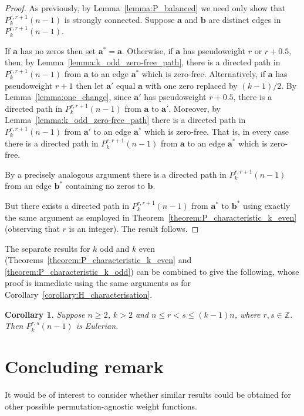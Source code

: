\documentclass[a4paper,11pt]{article}
\theoremstyle{plain}
\newtheorem{corollary}[lemma]{Corollary}
\theoremstyle{definition}
\theoremstyle{remark}
\begin{document}
\begin{proof}
As previously, by Lemma~\ref{lemma:P_balanced} we need only show that $P_k^{r,r+1}(n-1)$ is
strongly connected.  Suppose $\mathbf{a}$ and $\mathbf{b}$ are distinct edges in
$P_k^{r,r+1}(n-1)$.

If $\mathbf{a}$ has no zeros then set $\mathbf{a}^*=\mathbf{a}$. Otherwise, if $\mathbf{a}$ has
pseudoweight $r$ or $r+0.5$, then, by Lemma~\ref{lemma:k_odd_zero-free_path}, there is a directed
path in $P_k^{r,r+1}(n-1)$ from $\mathbf{a}$ to an edge $\mathbf{a}^*$ which is zero-free.
Alternatively, if $\mathbf{a}$ has pseudoweight $r+1$ then let $\mathbf{a}'$ equal $\mathbf{a}$
with one zero replaced by $(k-1)/2$.  By Lemma~\ref{lemma:one_change}, since $\mathbf{a}'$ has
pseudoweight $r+0.5$, there is a directed path in $P_k^{r,r+1}(n-1)$ from $\mathbf{a}$ to
$\mathbf{a}'$. Moreover,  by Lemma~\ref{lemma:k_odd_zero-free_path} there is a directed path in
$P_k^{r,r+1}(n-1)$ from $\mathbf{a}'$ to an edge $\mathbf{a}^*$ which is zero-free.  That is, in
every case there is a directed path in $P_k^{r,r+1}(n-1)$ from $\mathbf{a}$ to an edge
$\mathbf{a}^*$ which is zero-free.

By a precisely analogous argument there is a directed path in $P_k^{r,r+1}(n-1)$ from an edge
$\mathbf{b}^*$ containing no zeros to $\mathbf{b}$.

But there exists a directed path in $P_k^{r,r+1}(n-1)$ from $\mathbf{a}^*$ to $\mathbf{b}^*$ using
exactly the same argument as employed in Theorem~\ref{theorem:P_characteristic_k_even} (observing
that $r$ is an integer).  The result follows.
\end{proof}

The separate results for $k$ odd and $k$ even (Theorems~\ref{theorem:P_characteristic_k_even} and
\ref{theorem:P_characteristic_k_odd}) can be combined to give the following, whose proof is
immediate using the same arguments as for Corollary~\ref{corollary:H_characterisation}.

\begin{corollary} \label{corollary:P_characteristic}
Suppose $n\geq2$, $k>2$ and $n\leq r< s\leq (k-1)n$, where $r,s\in\mathbb{Z}$. Then
$P_k^{r,s}(n-1)$ is Eulerian.
\end{corollary}

\section{Concluding remark}

It would be of interest to consider whether similar results could be obtained for other possible
permutation-agnostic weight functions.
\end{document}
